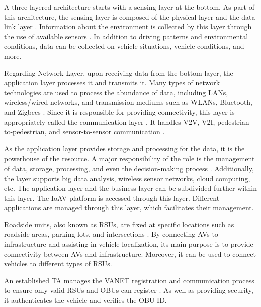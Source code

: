 \documentclass[a4paper,12pt]{article}
\begin{document}
\hspace{5mm} A three-layered architecture starts with a sensing layer at the bottom. As part of this architecture, the sensing layer is composed of the physical layer and the data link layer \cite{article23}. Information about the environment is collected by this layer through the use of available sensors \cite{article23}. In addition to driving patterns and environmental conditions, data can be collected on vehicle situations, vehicle conditions, and more.

\hspace{5mm} Regarding Network Layer, upon receiving data from the bottom layer, the application layer processes it and transmits it. Many types of network technologies are used to process the abundance of data, including LANs, wireless/wired networks, and transmission mediums such as WLANs, Bluetooth, and Zigbees \cite{article23}. Since it is responsible for providing connectivity, this layer is appropriately called the communication layer \cite{article23}. It handles V2V, V2I, pedestrian-to-pedestrian, and sensor-to-sensor communication \cite{article23}.

\hspace{5mm} As the application layer provides storage and processing for the data, it is the powerhouse of the resource. A major responsibility of the role is the management of data, storage, processing, and even the decision-making process \cite{article23}. Additionally, the layer supports big data analysis, wireless sensor networks, cloud computing, etc. The application layer and the business layer can be subdivided further within this layer. The IoAV platform is accessed through this layer. Different applications are managed through this layer, which facilitates their management.

\hspace{5mm} Roadside units, also known as RSUs, are fixed at specific locations such as roadside areas, parking lots, and intersections \cite{article24}. By connecting AVs to infrastructure and assisting in vehicle localization, its main purpose is to provide connectivity between AVs and infrastructure. Moreover, it can be used to connect vehicles to different types of RSUs.

\hspace{5mm} An established TA manages the VANET registration and communication process to ensure only valid RSUs and OBUs can register \cite{article24}. As well as providing security, it authenticates the vehicle and verifies the OBU ID.
\end{document}
